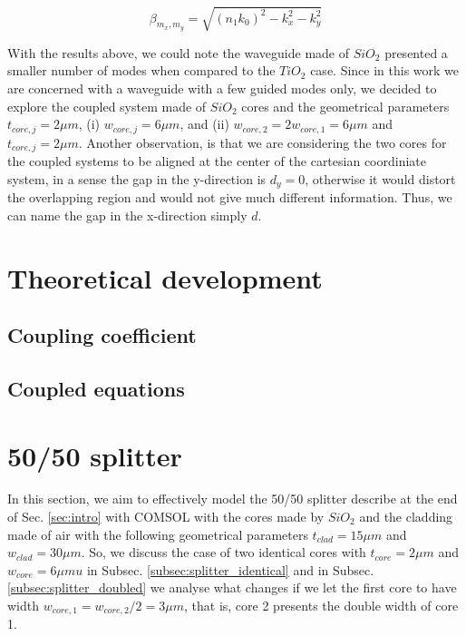 \documentclass[conference, a4paper]{IEEEtran}
\begin{document}
\begin{equation}
    \beta_{m_x, m_y} = \sqrt{(n_1 k_0)^2 - k_x^2 - k_y^2}
    \label{eq:intro_rectangle}
\end{equation}

With the results above, we could note the waveguide made of $SiO_2$ presented a smaller number of modes when compared to the $TiO_2$ case. Since in this work we are concerned with a waveguide with a few guided modes only, we decided to explore the coupled system made of $SiO_2$ cores and the geometrical parameters $t_{core,j} = 2\mu m$, (i) $w_{core, j} = 6 \mu m$, and (ii) $w_{core, 2} = 2 w_{core, 1} = 6\mu m$ and $t_{core, j} = 2\mu m$. Another observation, is that we are considering the two cores for the coupled systems to be aligned at the center of the cartesian coordiniate system, in a sense the gap in the y-direction is $d_y = 0$, otherwise it would distort the overlapping region and would not give much different information. Thus, we can name the gap in the x-direction simply $d$.

\section{Theoretical development}
\label{sec:theory}

\subsection{Coupling coefficient}
\label{subsec:theory_coefficient}

\subsection{Coupled equations}
\label{subsec:theory_equations}

\section{50/50 splitter}
\label{sec:splitter}

In this section, we aim to effectively model the 50/50 splitter describe at the end of Sec. \ref{sec:intro} with COMSOL with the cores made by $SiO_2$ and the cladding made of air with the following geometrical parameters $t_{clad} = 15\mu m$ and $w_{clad} = 30\mu m$. So, we discuss the case of two identical cores with $t_{core} = 2\mu m$ and $w_{core} = 6\mu mu$ in Subsec. \ref{subsec:splitter_identical} and in Subsec. \ref{subsec:splitter_doubled} we analyse what changes if we let the first core to have width $w_{core, 1} = w_{core, 2}/2 = 3\mu m$, that is, core 2 presents the double width of core 1.
    
\end{document}
